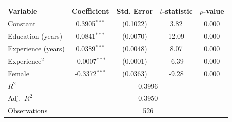 \begin{tabular}{lcccc}
\toprule
Variable & Coefficient & Std. Error & $t$-statistic & $p$-value \\
\midrule
Constant & 0.3905$^{***}$ & (0.1022) & 3.82 & 0.000 \\
Education (years) & 0.0841$^{***}$ & (0.0070) & 12.09 & 0.000 \\
Experience (years) & 0.0389$^{***}$ & (0.0048) & 8.07 & 0.000 \\
Experience$^2$ & -0.0007$^{***}$ & (0.0001) & -6.39 & 0.000 \\
Female & -0.3372$^{***}$ & (0.0363) & -9.28 & 0.000 \\
\midrule
$R^2$ & \multicolumn{4}{c}{0.3996} \\
Adj.\ $R^2$ & \multicolumn{4}{c}{0.3950} \\
Observations & \multicolumn{4}{c}{526} \\
\bottomrule
\end{tabular}
